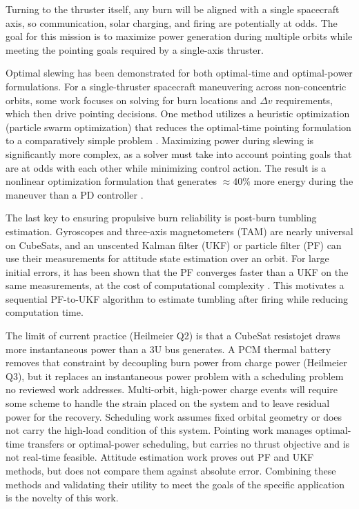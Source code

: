 Turning to the thruster itself, any burn will be aligned with a single spacecraft axis, so communication, solar charging, and firing are potentially at odds. The goal for this mission is to maximize power generation during multiple orbits while meeting the pointing goals required by a single-axis thruster.

Optimal slewing has been demonstrated for both optimal-time and optimal-power formulations. For a single-thruster spacecraft maneuvering across non-concentric orbits, some work focuses on solving for burn locations and $\Delta v$ requirements, which then drive pointing decisions. One method utilizes a heuristic optimization (particle swarm optimization) that reduces the optimal-time pointing formulation to a comparatively simple problem \cite{zhangFinitetimeAttitudeSetpoint2020}. Maximizing power during slewing is significantly more complex, as a solver must take into account pointing goals that are at odds with each other while minimizing control action. The result is a nonlinear optimization formulation that generates $\approx 40\%$ more energy during the maneuver than a PD controller \cite{kristiansenEnergyOptimalAttitude2024}\cite{kristiansenEnergyOptimalAttitude2021}.

The last key to ensuring propulsive burn reliability is post-burn tumbling estimation. Gyroscopes and three-axis magnetometers (TAM) are nearly universal on CubeSats, and an unscented Kalman filter (UKF) or particle filter (PF) can use their measurements for attitude state estimation over an orbit. For large initial errors, it has been shown that the PF converges faster than a UKF on the same measurements, at the cost of computational complexity \cite{xue-yuanjiangSpacecraftAttitudeEstimation2005}. This motivates a sequential PF-to-UKF algorithm to estimate tumbling after firing while reducing computation time.

The limit of current practice (Heilmeier Q2) is that a CubeSat resistojet draws more instantaneous power than a 3U bus generates. A PCM thermal battery removes that constraint by decoupling burn power from charge power (Heilmeier Q3), but it replaces an instantaneous power problem with a scheduling problem no reviewed work addresses. Multi-orbit, high-power charge events will require some scheme to handle the strain placed on the system and to leave residual power for the recovery. Scheduling work \cite{akarneSelfAdaptiveEnergyAwarePower2026}\cite{doff-sottaSpacecraftEnergyManagement2022}\cite{husseinOptimizedLoadSchedulingAlgorithm2023} assumes fixed orbital geometry or does not carry the high-load condition of this system. Pointing work \cite{zhangFinitetimeAttitudeSetpoint2020}\cite{kristiansenEnergyOptimalAttitude2024}\cite{kristiansenEnergyOptimalAttitude2021} manages optimal-time transfers or optimal-power scheduling, but carries no thrust objective and is not real-time feasible. Attitude estimation work \cite{xue-yuanjiangSpacecraftAttitudeEstimation2005} proves out PF and UKF methods, but does not compare them against absolute error. Combining these methods and validating their utility to meet the goals of the specific application is the novelty of this work.
